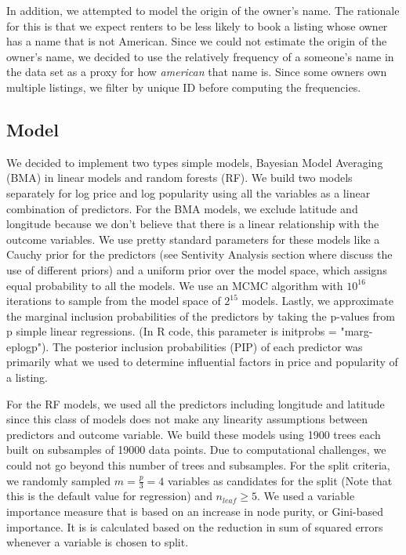 \documentclass[10pt]{jmlr}%
\begin{document}
In addition, we attempted to model the origin of the owner's name. The rationale for this is that we expect renters to be less likely to book a listing whose owner has a name that is not American. Since we could not estimate the origin of the owner's name, we decided to use the relatively frequency of a someone's name in the data set as a proxy for how \textit{american} that name is. Since some owners own multiple listings, we filter by unique ID before computing the frequencies.



\subsection{Model}
We decided to implement two types simple models, Bayesian Model Averaging (BMA) in linear models and random forests (RF). We build two models separately for log price and log popularity using all the variables as a linear combination of predictors. For the BMA models, we exclude latitude and longitude because we don't believe that there is a linear relationship with the outcome variables. We use pretty standard parameters for these models like a Cauchy prior for the predictors (see Sentivity Analysis section where discuss the use of different priors) and a uniform prior over the model space, which assigns equal probability to all the models. We use an MCMC algorithm with $10^{16}$ iterations to sample from the model space of $2^{15}$ models. Lastly, we approximate the marginal inclusion probabilities of the predictors by taking the p-values from p simple linear regressions. (In R code, this parameter is initprobs = "marg-eplogp"). The posterior inclusion probabilities (PIP) of each predictor was primarily what we used to determine influential factors in price and popularity of a listing. 

For the RF models, we used all the predictors including longitude and latitude since this class of models does not make any linearity assumptions between predictors and outcome variable. We build these models using 1900 trees each built on subsamples of 19000 data points. Due to computational challenges, we could not go beyond this number of trees and subsamples. For the split criteria, we randomly sampled $m = \frac{p}{3} = 4$ variables as candidates for the split (Note that this is the default value for regression) and $n_{leaf} \geq 5$. We used a variable importance measure that is based on an increase in node purity, or Gini-based importance. It is is calculated based on the reduction in sum of squared errors whenever a variable is chosen to split.
\end{document}
